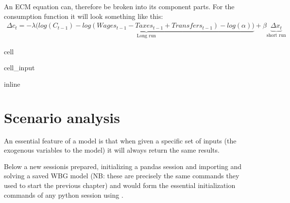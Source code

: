 \documentclass[letterpaper,10pt,english]{jupyterBook}
\begin{document}
\sphinxAtStartPar
An ECM equation can, therefore be broken into its component parts.  For the consumption function it will look something like this:
\begin{equation*}
\begin{split}\Delta c_t = -\lambda (\underbrace{
        log(C_{t-1})-log(Wages_{t-1}-Taxes_{t-1}+Transfers_{t-1}) -log(\alpha))}  _\text{Long run}
+\beta \underbrace{\Delta x_t}_\text{short run}\end{split}
\end{equation*}
\sphinxstepscope

\begin{sphinxuseclass}{cell}\begin{sphinxVerbatimInput}

\begin{sphinxuseclass}{cell_input}
\begin{sphinxVerbatim}[commandchars=\\\{\}]
 inline
\end{sphinxVerbatim}

\end{sphinxuseclass}\end{sphinxVerbatimInput}

\end{sphinxuseclass}

\chapter{Scenario analysis}
\label{\detokenize{content/05_WBModels/ScenarioAnalysis:scenario-analysis}}\label{\detokenize{content/05_WBModels/ScenarioAnalysis::doc}}
\sphinxAtStartPar
An essential feature of a model is that when given a specific set of inputs (the exogenous variables to the model) it will always return the same results.

\sphinxAtStartPar
Below a new  sessionis prepared, initializing a pandas session and importing and solving a saved WBG model (NB: these are precisely the same commands they used to start the previous chapter) and would form the essential initialization commands of any python session using .
\end{document}
